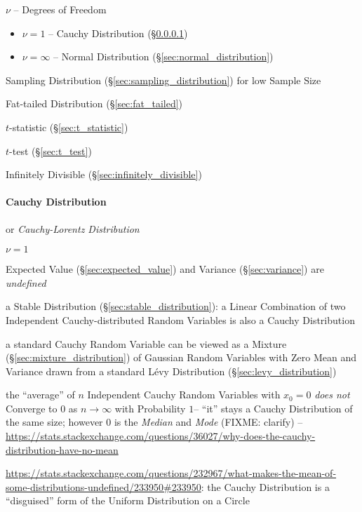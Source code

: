 $\nu$ -- Degrees of Freedom

\begin{itemize}
  \item $\nu = 1$ -- Cauchy Distribution (\S\ref{sec:cauchy_distribution})
  \item $\nu = \infty$ -- Normal Distribution (\S\ref{sec:normal_distribution})
\end{itemize}

Sampling Distribution (\S\ref{sec:sampling_distribution}) for low Sample Size

Fat-tailed Distribution (\S\ref{sec:fat_tailed})

$t$-statistic (\S\ref{sec:t_statistic})

$t$-test (\S\ref{sec:t_test})

Infinitely Divisible (\S\ref{sec:infinitely_divisible})



\paragraph{Cauchy Distribution}\label{sec:cauchy_distribution}\hfill

or \emph{Cauchy-Lorentz Distribution}

$\nu = 1$

Expected Value (\S\ref{sec:expected_value}) and Variance (\S\ref{sec:variance})
are \emph{undefined}

a Stable Distribution (\S\ref{sec:stable_distribution}): a Linear Combination of
two Independent Cauchy-distributed Random Variables is also a Cauchy
Distribution

a standard Cauchy Random Variable can be viewed as a Mixture
(\S\ref{sec:mixture_distribution}) of Gaussian Random Variables with Zero Mean
and Variance drawn from a standard L\'evy Distribution
(\S\ref{sec:levy_distribution})

the ``average'' of $n$ Independent Cauchy Random Variables with $x_0 = 0$
\emph{does not} Converge to $0$ as $n \to \infty$ with Probability $1$-- ``it''
stays a Cauchy Distribution of the same size; however $0$ is the \emph{Median}
and \emph{Mode} (FIXME: clarify)
--\url{https://stats.stackexchange.com/questions/36027/why-does-the-cauchy-distribution-have-no-mean}

\url{https://stats.stackexchange.com/questions/232967/what-makes-the-mean-of-some-distributions-undefined/233950#233950}:
the Cauchy Distribution is a ``disguised'' form of the Uniform Distribution on a
Circle


